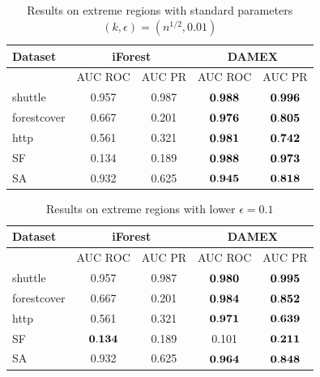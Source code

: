\begin{table}[!ht]
\caption{Results on extreme regions with standard parameters $(k,\epsilon) = (n^{1/2}, 0.01)$}
\label{jmva:table:results-dbad+iforest-01}
\centering
\begin{tabular}{lcccc}
  \toprule
Dataset      &\multicolumn{2}{c}{iForest}& \multicolumn{2}{c}{DAMEX}\\\hline
~            &AUC ROC       & AUC PR     &AUC ROC     &AUC PR       \\
shuttle      & 0.957        & 0.987      &$\mathbf{0.988}$&$\mathbf{0.996}$ \\
forestcover  & 0.667        & 0.201      &$\mathbf{0.976}$&$\mathbf{0.805}$ \\
http         & 0.561        & 0.321      &$\mathbf{0.981}$&$\mathbf{0.742}$ \\
SF           & 0.134        & 0.189      &$\mathbf{0.988}$&$\mathbf{0.973}$ \\
SA           & 0.932        &0.625       &$\mathbf{0.945}$&$\mathbf{0.818}$ \\ 
\bottomrule
\end{tabular}
\end{table}


\begin{table}[!ht]
\caption{Results on extreme regions with lower $\epsilon=0.1$}
\label{jmva:table:results-dbad+iforest-1}
\centering
\begin{tabular}{lcccc}
  \toprule
Dataset      &\multicolumn{2}{c}{iForest}& \multicolumn{2}{c}{DAMEX}\\\hline
~            &AUC ROC       & AUC PR     &AUC ROC     &AUC PR       \\
shuttle      & 0.957        & 0.987      &$\mathbf{0.980}$&$\mathbf{0.995}$ \\
forestcover  & 0.667        & 0.201      &$\mathbf{0.984}$&$\mathbf{0.852}$ \\
http         & 0.561        & 0.321      &$\mathbf{0.971}$&$\mathbf{0.639}$ \\
SF           & $\mathbf{0.134}$ & 0.189      &0.101       &$\mathbf{0.211}$ \\
SA           & 0.932        &0.625       &$\mathbf{0.964}$&$\mathbf{0.848}$ \\ 
\bottomrule
\end{tabular}
\end{table}


